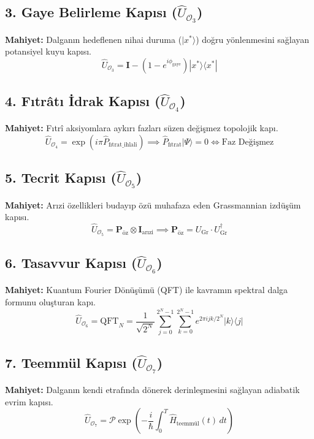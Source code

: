 \documentclass[11pt, a4paper]{article}
\begin{document}
\subsection{3. Gaye Belirleme Kapısı ($\hat{U}_{\mathcal{O}_3}$)}
\textbf{Mahiyet:} Dalganın hedeflenen nihai duruma ($|x^*\rangle$) doğru yönlenmesini sağlayan potansiyel kuyu kapısı.
\begin{equation}
\hat{U}_{\mathcal{O}_3} = \mathbf{I} - (1 - e^{i\phi_{\text{gaye}}}) |x^*\rangle \langle x^*|
\end{equation}

\subsection{4. Fıtrâtı İdrak Kapısı ($\hat{U}_{\mathcal{O}_4}$)}
\textbf{Mahiyet:} Fıtrî aksiyomlara aykırı fazları süzen değişmez topolojik kapı.
\begin{equation}
\hat{U}_{\mathcal{O}_4} = \exp\left( i \pi \hat{P}_{\text{fıtrat\_ihlali}} \right) \implies \hat{P}_{\text{fıtrat}} |\Psi\rangle = 0 \iff \text{Faz Değişmez}
\end{equation}

\subsection{5. Tecrit Kapısı ($\hat{U}_{\mathcal{O}_5}$)}
\textbf{Mahiyet:} Arızi özellikleri budayıp özü muhafaza eden Grassmannian izdüşüm kapısı.
\begin{equation}
\hat{U}_{\mathcal{O}_5} = \mathbf{P}_{\text{öz}} \otimes \mathbf{I}_{\text{arızi}} \implies \mathbf{P}_{\text{öz}} = U_{\text{Gr}} \cdot U_{\text{Gr}}^\dagger
\end{equation}

\subsection{6. Tasavvur Kapısı ($\hat{U}_{\mathcal{O}_6}$)}
\textbf{Mahiyet:} Kuantum Fourier Dönüşümü (QFT) ile kavramın spektral dalga formunu oluşturan kapı.
\begin{equation}
\hat{U}_{\mathcal{O}_6} = \text{QFT}_N = \frac{1}{\sqrt{2^N}} \sum_{j=0}^{2^N-1} \sum_{k=0}^{2^N-1} e^{2\pi i j k / 2^N} |k\rangle \langle j|
\end{equation}

\subsection{7. Teemmül Kapısı ($\hat{U}_{\mathcal{O}_7}$)}
\textbf{Mahiyet:} Dalganın kendi etrafında dönerek derinleşmesini sağlayan adiabatik evrim kapısı.
\begin{equation}
\hat{U}_{\mathcal{O}_7} = \mathcal{P} \exp\left( -\frac{i}{\hbar} \int_0^T \hat{H}_{\text{teemmül}}(t) \, dt \right)
\end{equation}
\end{document}
